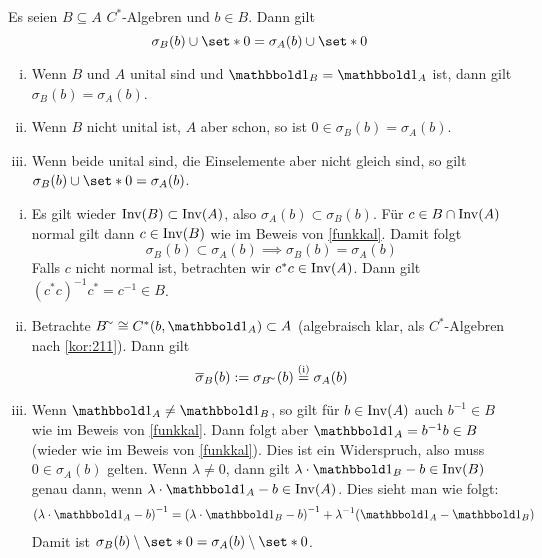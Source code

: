 \begin{korollar}[label=korr:220,{name=[Spektrum in C*-Unteralgebren]}]
	Es seien $B \subseteq A$  $C^*$-Algebren und $b \in B$. Dann gilt
	\[
		\sigma_B(b) \cup \set*{0} = \sigma_A(b) \cup \set*{0}
	\]
	\begin{enumerate}[(i),itemsep=0pt]
		\item Wenn $B$ und $A$ unital sind und $\ind_B=\ind_A$ ist, dann gilt $\sigma_B(b) = \sigma_A(b)$.
		\item Wenn $B$ nicht unital ist, $A$ aber schon, so ist $0 \in \sigma_B(b) = \sigma_A(b)$. 
		\item Wenn beide unital sind, die Einselemente aber nicht gleich sind, so gilt $\sigma_B(b) \cup \set*{0} = \sigma_A(b)$.
	\end{enumerate}
\end{korollar}
\begin{beweis} \leavevmode
	\begin{enumerate}[(i)]
		\item Es gilt wieder $\operatorname{Inv}(B) \subset \operatorname{Inv}(A)$, also $\sigma_A(b) \subset \sigma_B(b)$.
		Für $c \in B \cap \operatorname{Inv}(A)$ normal gilt dann $c \in \operatorname{Inv}(B)$ wie im Beweis von \autoref{funkkal}. Damit folgt
		\[
			\sigma_B(b) \subset \sigma_A(b) \implies \sigma_B(b) = \sigma_A(b)
		\]
		Falls $c$ nicht normal ist, betrachten wir $c^*c \in \operatorname{Inv}(A)$. Dann gilt $(c^*c)^{-1} c^* = c^{-1} \in B$.
		\item Betrachte $B^\simm \cong C^*(b,\ind_A) \subset A$ (algebraisch klar, als $C^*$-Algebren nach \autoref{kor:211}). Dann gilt
		\[
			\overline{\sigma}_B(b) := \sigma_{B^\simm}(b) \StackText{(i)}{=}\sigma_A(b)
		\]
		\item Wenn $\ind_A \neq \ind_B$, so gilt für $b \in \operatorname{Inv}(A)$ auch $b^{-1}\in B$ wie im Beweis von \autoref{funkkal}. 
		Dann folgt aber $\ind_A = b^{-1}b\in B$ (wieder wie im Beweis von \ref{funkkal}). 
		Dies ist ein Widerspruch, also muss $0 \in \sigma_A(b)$ gelten. 
		Wenn $\lambda \neq 0$, dann gilt $\lambda \cdot \ind_B - b \in \Inv(B)$ genau dann, wenn $\lambda \cdot \ind_A -b \in \Inv(A)$. 
		Dies sieht man wie folgt:
		\begin{align}
			\enbrace*{\lambda \cdot \ind_A- b}^{-1} = \enbrace*{\lambda \cdot \ind_B -b}^{-1} + \lambda^{-1}\enbrace*{\ind_A-\ind_B}
		\end{align}
		Damit ist $\sigma_B(b) \setminus \set*{0} = \sigma_A(b) \setminus \set*{0}$. \qedhere
	\end{enumerate}
\end{beweis}
\newpage

